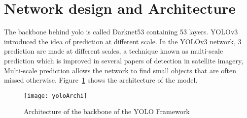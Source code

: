 \section{Network design and Architecture}
The backbone behind \gls{yolo} is called Darknet53 containing 53 layers. YOLOv3\cite{yolov3} introduced the idea of prediction at different scale. In the YOLOv3 network, 3 prediction are made at different scales, a technique known as multi-scale prediction which is improved in several papers of detection in satellite imagery, Multi-scale prediction allows the network to find small objects that are often missed otherwise. Figure~\ref{fig:yoloArchi} shows the architecture of the model.

\begin{figure}[h!]
  \centering
	\texttt{[image: yoloArchi]}
	\caption[Architecture of the backbone of the YOLO Framework]{Architecture of the backbone of the YOLO Framework}
  \label{fig:yoloArchi}
\end{figure}

